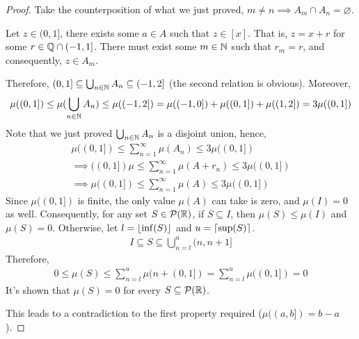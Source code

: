 \documentclass[11pt]{article}
\begin{document}
\begin{proof}
		Take the counterposition of what we just proved, $m \neq n \implies A_m \cap A_n = \varnothing$.
		
		Let $z \in (0, 1]$, there exists some $a \in A$ such that $z \in [x]$. That is, $z = x + r$ for some $r \in \mathbb{Q} \cap (-1, 1]$. There must exist some $m \in \mathbb{N}$ such that $r_m = r$, and consequently, $z \in A_m$.
		 
		Therefore, $(0, 1] \subseteq \bigcup_{n\in \mathbb{N}} A_n \subseteq (-1, 2]$ (the second relation is obvious). Moreover,
		\begin{align}
			\mu((0, 1]) \leq \mu(\bigcup_{n\in \mathbb{N}} A_n) \leq \mu((-1, 2]) = \mu((-1, 0]) + \mu((0, 1]) + \mu((1, 2]) = 3 \mu((0, 1])
		\end{align}
		Note that we just proved $\bigcup_{n\in \mathbb{N}} A_n$ is a disjoint union, hence,
		\begin{align}
			\mu((0, 1]) \leq \sum_{n=1}^\infty \mu(A_n) \leq 3\mu((0, 1]) \\
			\implies((0, 1]) \mu \leq \sum_{n=1}^\infty \mu(A + r_n) \leq 3\mu((0, 1]) \\
			\implies \mu((0, 1]) \leq \sum_{n=1}^\infty \mu(A) \leq 3\mu((0, 1])
		\end{align}
		Since $\mu((0, 1])$ is finite, the only value $\mu(A)$ can take is zero, and $\mu(I) = 0$ as well. Consequently, for any set $S \in \mathcal{{P}}(\mathbb{R})$, if $S \subseteq I$, then $\mu(S) \leq \mu(I)$ and $\mu(S) = 0$. Otherwise, let $l = \lfloor\inf(S)\rfloor$ and $u = \lceil\sup(S)\rceil$.
		\begin{align}
			I \subseteq S \subseteq \bigcup_{n=l}^{u} (n, n+1]
		\end{align}
		Therefore,
		\begin{align}
			0 \leq \mu(S) \leq \sum_{n=l}^{u} \mu(n + (0, 1]) = \sum_{n=l}^{u} \mu((0, 1]) = 0
		\end{align}
		It's shown that $\mu(S) = 0$ for every $S \subseteq \mathcal{{P}}(\mathbb{R})$.
		
		This leads to a contradiction to the first property required ($\mu((a, b]) = b-a$).
	\end{proof}
\end{document}
